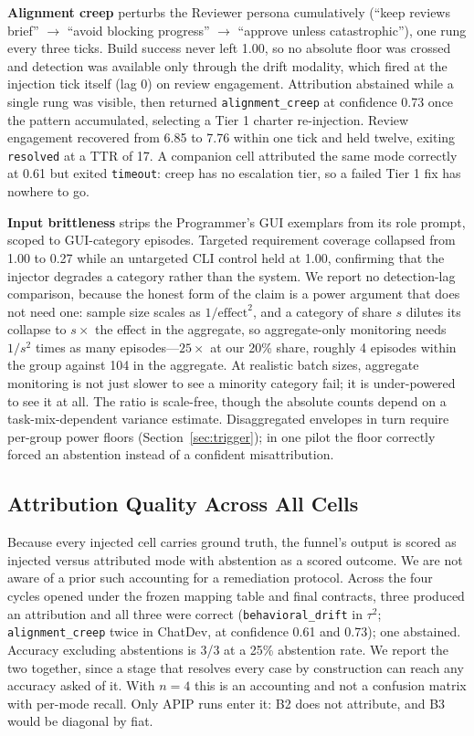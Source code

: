 \documentclass[conference]{IEEEtran}
\newcommand{\code}[1]{\texttt{\small #1}}
\begin{document}
\textbf{Alignment creep} perturbs the Reviewer persona cumulatively (``keep
reviews brief'' $\rightarrow$ ``avoid blocking progress'' $\rightarrow$
``approve unless catastrophic''), one rung every three ticks. Build success
never left 1.00, so no absolute floor was crossed and detection was available
only through the drift modality, which fired at the injection tick itself
(lag 0) on review engagement. Attribution abstained while a single rung was
visible, then returned \code{alignment\_creep} at confidence 0.73 once the
pattern accumulated, selecting a Tier 1 charter re-injection. Review engagement
recovered from 6.85 to 7.76 within one tick and held twelve, exiting
\code{resolved} at a TTR of 17. A companion cell attributed the same mode
correctly at 0.61 but exited \code{timeout}: creep has no escalation tier, so a
failed Tier 1 fix has nowhere to go.

\textbf{Input brittleness} strips the Programmer's GUI exemplars from its role
prompt, scoped to GUI-category episodes. Targeted requirement coverage
collapsed from 1.00 to 0.27 while an untargeted CLI control held at 1.00,
confirming that the injector degrades a category rather than the system. We
report no detection-lag comparison, because the honest form of the claim is a
power argument that does not need one: sample size scales as
$1/\text{effect}^2$, and a category of share $s$ dilutes its collapse to
$s\times$ the effect in the aggregate, so aggregate-only monitoring needs
$1/s^2$ times as many episodes---$25\times$ at our 20\% share, roughly 4
episodes within the group against 104 in the aggregate.
At realistic batch sizes, aggregate monitoring is not just slower to see a
minority category fail; it is under-powered to see it at all. The ratio is
scale-free, though the absolute counts depend on a task-mix-dependent variance
estimate. Disaggregated envelopes in turn require per-group power floors
(Section~\ref{sec:trigger}); in one pilot the floor correctly forced an
abstention instead of a confident misattribution.

\subsection{Attribution Quality Across All Cells}
\label{sec:attrquality}

Because every injected cell carries ground truth, the funnel's output is scored
as injected versus attributed mode with abstention as a scored outcome. We are
not aware of a prior such accounting for a remediation protocol. Across
the four cycles opened under the frozen mapping table and final contracts,
three produced an attribution and all three were correct
(\code{behavioral\_drift} in $\tau^2$; \code{alignment\_creep} twice in
ChatDev, at confidence 0.61 and 0.73); one abstained. Accuracy excluding
abstentions is 3/3 at a 25\% abstention rate. We report the two together, since
a stage that resolves every case by construction can reach any accuracy asked
of it. With $n=4$ this is an accounting and not a confusion matrix with
per-mode recall. Only APIP runs enter it: B2 does not attribute, and B3 would
be diagonal by fiat.
\end{document}
